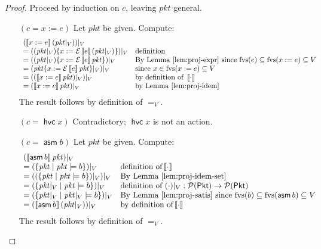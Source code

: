 \documentclass{article}
\newcommand{\pkt}{\mathit{pkt}}
\newcommand{\denote}[1]{\left\llbracket#1\right\rrbracket}
\newcommand{\edenote}[1]{\mathcal{E}\denote{#1}}
\newcommand{\Pkt}{\mathsf{Pkt}}
\newcommand{\assume}{\mathop{\mathsf{asm}}}
\newcommand{\havoc}[1]{\mathop{\mathsf{hvc}}#1}
\newcommand{\fvs}{\textrm{fvs}}
\begin{document}
\begin{proof}
  Proceed by induction on $c$, leaving $\pkt$ general.
  \begin{enumerate}[align=left]
  \item[$(c = x:=e)$] Let $\pkt$ be given. Compute:
    \[\begin{array}{ll}
    (\denote{x:=e} (\pkt|_V))|_V\\
    = ((\pkt|_V)\{x:=\edenote{e}(\pkt|_V)\})|_V
    & \text{definition} \\
    = ((\pkt|_V)\{x := \edenote{e}\pkt\})|_V
    & \text{By Lemma~\ref{lem:proj-expr} since } \fvs(e) \subseteq \fvs(x := e) \subseteq V \\
    = (\pkt\{x := \edenote{e}\pkt\}|_V)|_V
    & \text{since } x \in \fvs(x:=e) \subseteq V \\
    = ((\denote{x:=e}\pkt)|_V)|_V
    & \text{by definition of }\denote{\cdot}\\
    = (\denote{x:=e}\pkt)|_V
    & \text{by Lemma~\ref{lem:proj-idem}}
    \end{array}\]
    The result follows by definition of $=_V$.

  \item[$(c = \havoc x)$] Contradictory; $\havoc x$ is not an action.
  \item[$(c = \assume b)$]
    Let $\pkt$ be given. Compute:
    \[\begin{array}{ll}
    (\denote{\assume b} \pkt)|_V \\
    = (\{\pkt \mid \pkt \models b\})|_V
    & \text{definition of}\denote\cdot\\
    = ((\{\pkt \mid \pkt \models b\})|_V)|_V
    & \text{By Lemma~\ref{lem:proj-idem-set}} \\
    = (\{\pkt|_V \mid \pkt \models b\})|_V
    & \text{definition of }(\cdot)|_V : \mathcal P (\Pkt) \to \mathcal P (\Pkt) \\
    = (\{\pkt|_V \mid \pkt|_V \models b\})|_V
    & \text{By Lemma~\ref{lem:proj-satis} since } \fvs(b) \subseteq \fvs(\assume b) \subseteq V \\
    = (\denote{\assume b}(\pkt|_V))|_V
    & \text{by definition of}\denote\cdot
    \end{array}
    \]
    The result follows by definition of $=_V$.


\end{enumerate}
\end{proof}
\end{document}
